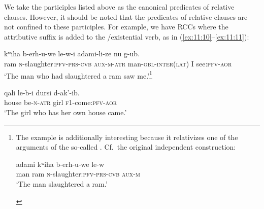 ﻿\documentclass[output=paper]{langsci/langscibook}
\begin{document}
We take the participles listed above as the canonical predicates of
relative clauses. However, it should be noted that the predicates of
relative clauses are not confined to these participles. For example, we
have RCCs where the attributive suffix is added to the /existential verb, as in (\ref{ex:11:10}–\ref{ex:11:11}):

\pagebreak

\ea \label{ex:11:10} %
\gll  kʷiha b-erh-u-we le-w-i adami-li-ze nu g-ub.\\
 ram \textsc{n}-slaughter:\textsc{pfv}-\textsc{prs}-\textsc{cvb} \textsc{aux}-\textsc{m}-\textsc{atr}   man-\textsc{obl}-\textsc{inter}(\textsc{lat}) I see:\textsc{pfv}-\textsc{aor}\\
\glt   `The man who had slaughtered a ram saw me.'\footnote{The example is
    additionally interesting because it relativizes one of the arguments
    of the so-called . Cf.\ the original
    independent construction:\vspace{-\jot}

    \begin{exe}
      \gll adami kʷiha b-erh-u-we le-w\\
      man ram \textsc{n}-slaughter:\textsc{pfv}-\textsc{prs}-\textsc{cvb} \textsc{aux}-\textsc{m}\\
      \glt `The man slaughtered a ram.'
    \end{exe}

    \removelastskip
    \vspace{-\baselineskip}
  }


\ex \label{ex:11:11} %
\gll  qali le-b-i dursi d-ak'-ib.\\
  house {be}-\textsc{n}-\textsc{atr} girl \textsc{f1}-come:\textsc{pfv}-\textsc{aor}\\
\glt `The girl who has her own house came.'
\z


\end{document}
